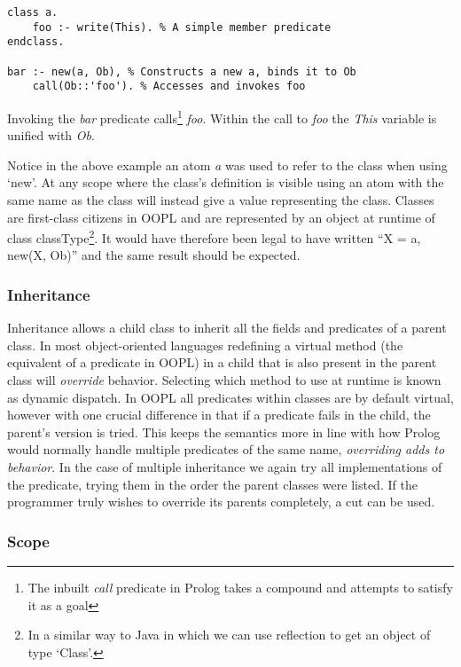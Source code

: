 \documentclass[12pt,a4paper,twoside,openright]{report}
\begin{document}
\begin{lstlisting}
class a.
	foo :- write(This). % A simple member predicate
endclass.

bar :- new(a, Ob), % Constructs a new a, binds it to Ob
	call(Ob::'foo'). % Accesses and invokes foo
\end{lstlisting}

Invoking the \emph{bar} predicate calls\footnote{The inbuilt \emph{call} predicate in Prolog takes a compound and attempts to satisfy it as a goal} \emph{foo}. Within the call to \emph{foo} the \emph{This} variable is unified with \emph{Ob}.

\bigskip

Notice in the above example an atom \emph{a} was used to refer to the class when using `new'. At any scope where the class's definition is visible using an atom with the same name as the class will instead give a value representing the class. Classes are first-class citizens in OOPL and are represented by an object at runtime of class classType\footnote{In a similar way to Java in which we can use reflection to get an object of type `Class'.}. It would have therefore been legal to have written ``X = a, new(X, Ob)'' and the same result should be expected.

\subsubsection {Inheritance}

Inheritance allows a child class to inherit all the fields and predicates of a parent class. In most object-oriented languages redefining a virtual method (the equivalent of a predicate in OOPL) in a child that is also present in the parent class will \emph{override} behavior. Selecting which method to use at runtime is known as dynamic dispatch. In OOPL all predicates within classes are by default virtual, however with one crucial difference in that if a predicate fails in the child, the parent's version is tried. This keeps the semantics more in line with how Prolog would normally handle multiple predicates of the same name, \emph{overriding adds to behavior}. In the case of multiple inheritance we again try all implementations of the predicate, trying them in the order the parent classes were listed. If the programmer truly wishes to override its parents completely, a cut can be used.

\subsubsection {Scope}
\end{document}
